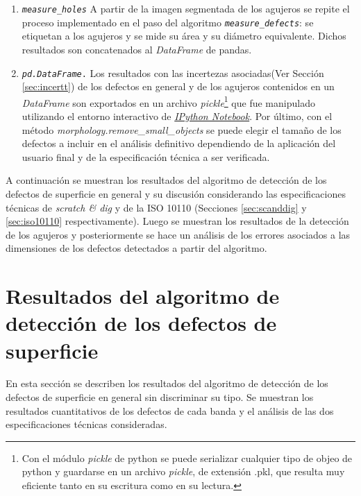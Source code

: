 \begin{enumerate}
\item \texttt{\textit{measure\_holes}} A partir de la imagen segmentada de los agujeros se repite el proceso implementado en el paso del algoritmo \texttt{\textit{measure\_defects}}: se etiquetan a los agujeros y se mide su área y su diámetro equivalente. Dichos resultados son concatenados al \textit{DataFrame} de pandas.
\item \texttt{\textit{pd.DataFrame}.} Los resultados con las incertezas asociadas(Ver Sección \ref{sec:incertt}) de los defectos en general y de los agujeros contenidos en un \textit{DataFrame} son exportados en un archivo \textit{pickle}\footnote{Con el módulo \textit{pickle} de python se puede serializar cualquier tipo de objeo de python y guardarse en un archivo \textit{pickle}, de extensión .pkl, que resulta muy eficiente tanto en su escritura como en su lectura.} que fue manipulado utilizando el entorno interactivo de \href{https://ipython.org/notebook.html}{\textit{IPython Notebook}}. Por último, con el método \textit{morphology.remove\_small\_objects} se puede elegir el tamaño de los defectos a incluir en el análisis definitivo dependiendo de la aplicación del usuario final y de la especificación técnica a ser verificada.
\end{enumerate}

A continuación se muestran los resultados del algoritmo de detección de los defectos de superficie en general y su discusión considerando las especificaciones técnicas de \textit{scratch \& dig} y de la ISO 10110 (Secciones \ref{sec:scanddig} y \ref{sec:iso10110} respectivamente). Luego se muestran los resultados de la detección de los agujeros y posteriormente se hace un análisis de los errores asociados a las dimensiones de los defectos detectados a partir del algoritmo.

\singlespacing
\section{Resultados del algoritmo de detección de los defectos de superficie \href{https://github.com/jrr1984/defects_analysis/blob/master/Defects\%20analysis.ipynb}{\faGithub}}


\hspace{0.5cm}En esta sección se describen los resultados del algoritmo de detección de los defectos de superficie en general sin discriminar su tipo. Se muestran los resultados cuantitativos de los defectos de cada banda y el análisis de las dos especificaciones técnicas consideradas.



